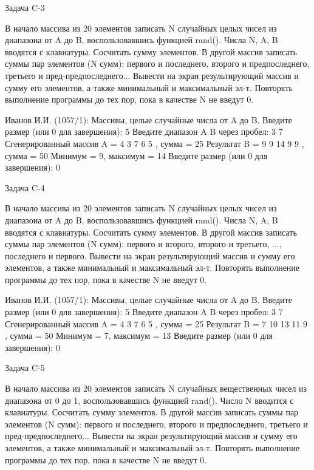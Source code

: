 
Задача C-3

В начало массива из 20 элементов записать N случайных целых чисел из диапазона
от A до B, воспользовавшись функцией rand(). Числа N, A, B вводятся с
клавиатуры. Сосчитать сумму элементов. В другой массив записать суммы пар
элементов (N сумм): первого и последнего, второго и предпоследнего, третьего и
пред-предпоследнего... Вывести на экран результирующий массив и сумму его
элементов, а также минимальный и максимальный эл-т. Повторять выполнение
программы до тех пор, пока в качестве N не введут 0.

Иванов И.И. (1057/1): Массивы, целые случайные числа от A до B.
Введите размер (или 0 для завершения): 5
Введите диапазон A B через пробел: 3 7
Сгенерированный массив A = { 4 3 7 6 5 }, сумма = 25
Результат B = { 9 9 14 9 9 }, сумма = 50
Минимум = 9, максимум = 14
Введите размер (или 0 для завершения): 0


Задача C-4

В начало массива из 20 элементов записать N случайных целых чисел из диапазона
от A до B, воспользовавшись функцией rand(). Числа N, A, B вводятся с
клавиатуры. Сосчитать сумму элементов. В другой массив записать суммы пар
элементов (N сумм): первого и второго, второго и третьего, ..., последнего и
первого. Вывести на экран результирующий массив и сумму его элементов, а также
минимальный и максимальный эл-т. Повторять выполнение программы до тех пор,
пока в качестве N не введут 0.

Иванов И.И. (1057/1): Массивы, целые случайные числа от A до B.
Введите размер (или 0 для завершения): 5
Введите диапазон A B через пробел: 3 7
Сгенерированный массив A = { 4 3 7 6 5 }, сумма = 25
Результат B = { 7 10 13 11 9 }, сумма = 50
Минимум = 7, максимум = 13
Введите размер (или 0 для завершения): 0


Задача C-5

В начало массива из 20 элементов записать N случайных вещественных чисел из
диапазона от 0 до 1, воспользовавшись функцией rand(). Число N вводится с
клавиатуры. Сосчитать сумму элементов. В другой массив записать суммы пар
элементов (N сумм): первого и последнего, второго и предпоследнего, третьего и
пред-предпоследнего... Вывести на экран результирующий массив и сумму его
элементов, а также минимальный и максимальный эл-т. Повторять выполнение
программы до тех пор, пока в качестве N не введут 0.

